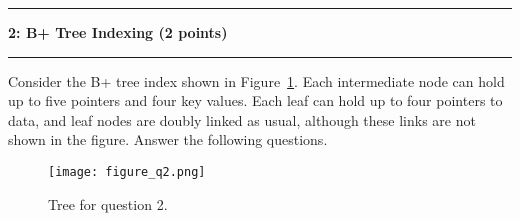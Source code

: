 \documentclass[11pt]{article}
\newcommand\question[2]{\vspace{.25in}\hrule\textbf{#1: #2}\vspace{.5em}\hrule\vspace{.10in}}
\begin{document}
\question{2}{B+ Tree Indexing (2 points)}
Consider the B+ tree index shown in Figure~\ref{figure:q2}. 
Each intermediate node can hold up to five pointers and four key values. Each leaf can hold up to four pointers to data, and leaf nodes are doubly linked as usual, although these links are not shown in the figure.
Answer the following questions.\\

\begin{figure}[h]
	\centering
	\texttt{[image: figure\_q2.png]}
	\caption{Tree for question 2.}
	\label{figure:q2}
\end{figure}

\begin{comment}
{"keys": [25,55,75],
 "children": [{"keys": [5,10,15,20]}, {"keys": [25,28,30,50]}, {"keys": [55,60,65,70]}, {"keys": [75,80,85,90]}]
}
\end{comment}
\end{document}
